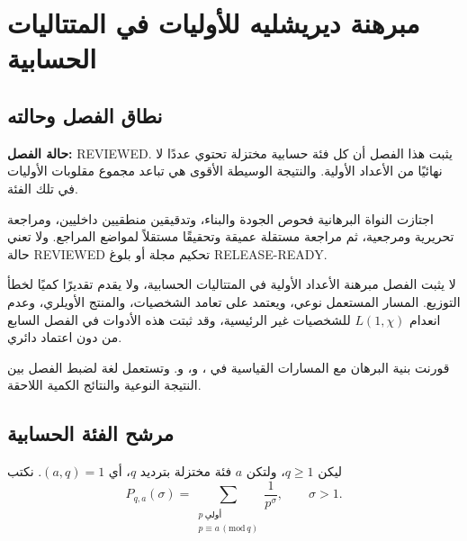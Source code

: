 \chapter{مبرهنة ديريشليه للأوليات في المتتاليات الحسابية}

\section{نطاق الفصل وحالته}

\noindent\textbf{حالة الفصل:} \textenglish{REVIEWED}. يثبت هذا الفصل أن كل
فئة حسابية مختزلة تحتوي عددًا لا نهائيًا من الأعداد الأولية. والنتيجة
الوسيطة الأقوى هي تباعد مجموع مقلوبات الأوليات في تلك الفئة.

اجتازت النواة البرهانية فحوص الجودة والبناء، وتدقيقين منطقيين داخليين،
ومراجعة تحريرية ومرجعية، ثم مراجعة مستقلة عميقة وتحقيقًا مستقلاً لمواضع
المراجع. ولا تعني حالة \textenglish{REVIEWED} تحكيم مجلة أو بلوغ
\textenglish{RELEASE-READY}.

لا يثبت الفصل مبرهنة الأعداد الأولية في المتتاليات الحسابية، ولا يقدم
تقديرًا كميًا لخطأ التوزيع. المسار المستعمل نوعي، ويعتمد على تعامد
الشخصيات، والمنتج الأويلري، وعدم انعدام \(L(1,\chi)\) للشخصيات غير
الرئيسية، وقد ثبتت هذه الأدوات في الفصل السابع من دون اعتماد دائري.

\begin{remark}
قورنت بنية البرهان مع المسارات القياسية في
\cite[الفصل 7، الأقسام 7.3--7.9، الصفحات 148--155]{Apostol1976}،
و\cite[الفصلان 1 و4، الصفحات 1--11 و27--34]{Davenport2000}،
و\cite[الفصل 4، القسمان 4.2--4.3، الصفحات 115--132]{MontgomeryVaughan2007}.
وتستعمل لغة \cite[الفصول 3 و5 و17، الصفحات 43--64 و93--152 و419--426]{IwaniecKowalski2004}
لضبط الفصل بين النتيجة النوعية والنتائج الكمية اللاحقة.
\end{remark}

\section{مرشح الفئة الحسابية}

ليكن \(q\geq1\)، ولتكن \(a\) فئة مختزلة بترديد \(q\)، أي
\((a,q)=1\). نكتب
\[
P_{q,a}(\sigma)
=
\sum_{\substack{p\ \text{أولي}\\ p\equiv a\, (\mathrm{mod}\,q)}}
\frac1{p^\sigma},
\qquad \sigma>1.
\]

